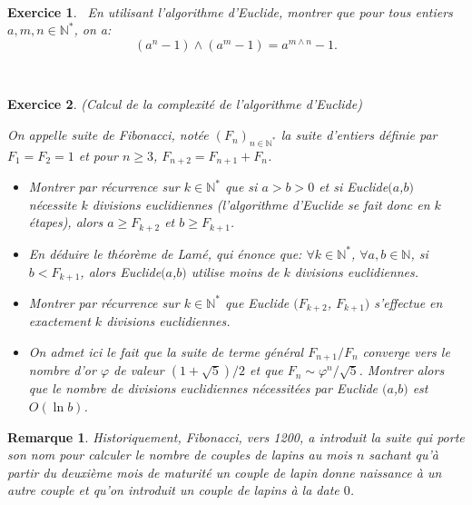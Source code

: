 \documentclass[11pt,a4paper]{article}
\newtheorem{ex}{Exercice}
\newtheorem*{rem}{Remarque}
\begin{document}
\



\begin{ex}\label{exPGCD_2n-1_2m-1}\
En utilisant l'algorithme d'Euclide, montrer que pour tous entiers $a,m,n \in \mathbb{N}^*$, on a: $$(a^n-1)\wedge(a^m-1)=a^{m\wedge n}-1.$$
\end{ex}

\


\begin{ex}\label{exComplexite_division_euclidienne}(Calcul de la complexité de l'algorithme d'Euclide)

On appelle suite de Fibonacci, notée $(F_n)_{n \in \mathbb{N}^*}$ la suite d'entiers définie par $F_1=F_2=1$ et pour $n\geqslant 3$, $F_{n+2}=F_{n+1}+F_n$. 
\begin{itemize}
\item[$1.$] Montrer par récurrence sur $k \in \mathbb{N}^*$ que si $a> b > 0$ et si Euclide$(a$,$b)$ nécessite $k$ divisions euclidiennes (l'algorithme d'Euclide se fait donc en $k$ étapes), alors $a \geq F_{k+2}$ et $b \geq F_{k+1}$.
\item[$2.$]En déduire le théorème de Lamé, qui énonce que: $\forall k \in \mathbb{N}^*$, $\forall a,b \in \mathbb{N}$, si $b<F_{k+1}$, alors Euclide$(a$,$b)$ utilise  moins de $k$ divisions euclidiennes.


\item[$3.$] Montrer par récurrence sur $k \in \mathbb{N}^*$ que Euclide $(F_{k+2}$, $F_{k+1})$ s'effectue en exactement $k$ divisions euclidiennes.


\item[$4.$] On admet ici le fait que la suite de terme général $F_{n+1}/F_n$ converge vers le nombre d'or $\varphi$ de valeur $(1+\sqrt{5})/2$ et que $F_n \sim \varphi^n/\sqrt{5}$. Montrer alors que le nombre de divisions euclidiennes nécessitées  par Euclide $(a$,$b)$ est $O(\ln b)$.
\end{itemize}
\end{ex}


\begin{rem}
Historiquement, Fibonacci, vers 1200, a introduit la suite qui porte son nom pour calculer le nombre de couples de lapins au mois $n$ sachant qu'à partir du deuxième mois de maturité un couple de lapin donne naissance à un autre couple et qu'on introduit un couple de lapins à la date $0$. 
\end{rem}

\
\end{document}
